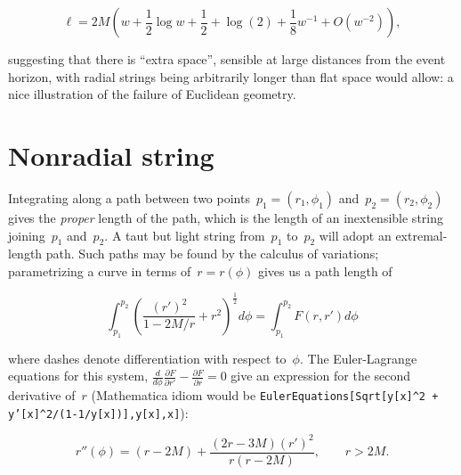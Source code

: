 \documentclass{ws-tpe}
\begin{document}
% 
\begin{equation}\label{asymptotic_ell}
  \ell = 2M\left(w +  \frac{1}{2}\log w + \frac{1}{2} + \log(2)  +  \frac{1}{8}w^{-1} + O(w^{-2})\right),
\end{equation}

\noindent suggesting that there is ``extra space'', sensible at large
distances from the event horizon, with radial strings being
arbitrarily longer than flat space would allow: a nice illustration of
the failure of Euclidean geometry.

\section{Nonradial string}
Integrating along a path between two
points~$p_1=\left(r_1,\phi_1\right)$ and~$p_2=\left(r_2,\phi_2\right)$
gives the {\em proper} length of the path, which is the length of an
inextensible string joining~$p_1$ and~$p_2$.  A taut but light string
from~$p_1$ to~$p_2$ will adopt an extremal-length path.  Such paths
may be found by the calculus of variations; parametrizing a curve in
terms of~$r=r\left(\phi\right)$ gives us a path length of


\begin{equation}
  \int_{p_1}^{p_2}\left(\frac{\left(r'\right)^2}{1-2M/r} + r^2\right)^\frac{1}{2}d\phi=
  \int_{p_1}^{p_2}F\left(r,r'\right)d\phi
\end{equation}

\noindent where dashes denote differentiation with respect to~$\phi$.
The Euler-Lagrange equations for this system,
$\frac{d}{d\phi}\frac{\partial F}{\partial r'}-\frac{\partial
  F}{\partial r}=0$ give an expression for the second derivative
of~$r$ (Mathematica idiom would be {\tt EulerEquations[Sqrt[y[x]\^{}2
      + y'[x]\^{}2/(1-1/y[x])],y[x],x]}):

\begin{equation}\label{rdashdash}
  r''\left(\phi\right) =
  (r-2M) + \frac{(2r-3M)\left(r'\right)^2}{r\left(r-2M\right)},\qquad r>2M.
\end{equation}
\end{document}
